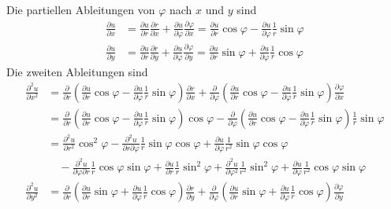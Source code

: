 Die partiellen Ableitungen von $\varphi$ nach $x$ und $y$ sind
\begin{align*}
\frac{\partial u}{\partial x}
&=
\frac{\partial u}{\partial r}
\frac{\partial r}{\partial x}
+
\frac{\partial u}{\partial\varphi}
\frac{\partial \varphi}{\partial x}
=
\frac{\partial u}{\partial r}
\cos\varphi
-
\frac{\partial u}{\partial\varphi}
\frac1r\sin\varphi
\\
\frac{\partial u}{\partial y}
&=
\frac{\partial u}{\partial r}
\frac{\partial r}{\partial y}
+
\frac{\partial u}{\partial\varphi}
\frac{\partial \varphi}{\partial y}
=
\frac{\partial u}{\partial r}
\sin\varphi
+
\frac{\partial u}{\partial\varphi}
\frac1r\cos\varphi
\end{align*}
Die zweiten Ableitungen sind
\begin{align*}
\frac{\partial^2u}{\partial x^2}
&=
\frac{\partial}{\partial r}
\left(
\frac{\partial u}{\partial r}
\cos\varphi
-
\frac{\partial u}{\partial\varphi}
\frac1r\sin\varphi
\right)
\frac{\partial r}{\partial x}
+
\frac{\partial }{\partial \varphi}
\left(
\frac{\partial u}{\partial r}
\cos\varphi
-
\frac{\partial u}{\partial\varphi}
\frac1r\sin\varphi
\right)
\frac{\partial\varphi}{\partial x}
\\
&=
\frac{\partial}{\partial r}
\left(
\frac{\partial u}{\partial r}
\cos\varphi
-
\frac{\partial u}{\partial\varphi}
\frac1r\sin\varphi
\right)
\cos\varphi
-
\frac{\partial }{\partial \varphi}
\left(
\frac{\partial u}{\partial r}
\cos\varphi
-
\frac{\partial u}{\partial\varphi}
\frac1r\sin\varphi
\right)
\frac1r\sin\varphi
\\
&=
\frac{\partial^2u}{\partial r^2} \cos^2\varphi
-
\frac{\partial^2u}{\partial r\partial\varphi} \frac1r\sin\varphi \cos\varphi
+
\frac{\partial u}{\partial\varphi} \frac1{r^2}\sin\varphi\cos\varphi
\\
&\quad
-
\frac{\partial^2u}{\partial\varphi\partial r}\frac1r \cos\varphi\sin\varphi
+\frac{\partial u}{\partial r}\frac1r\sin^2\varphi
+\frac{\partial^2u}{\partial\varphi^2}
\frac1{r^2}\sin^2\varphi
+\frac{\partial u}{\partial\varphi}\frac1{r^2}\cos\varphi\sin\varphi
\\
\frac{\partial^2u}{\partial y^2}
&=
\frac{\partial}{\partial r}
\left(
\frac{\partial u}{\partial r}
\sin\varphi
+
\frac{\partial u}{\partial\varphi}
\frac1r\cos\varphi
\right)
\frac{\partial r}{\partial y}
+
\frac{\partial}{\partial \varphi}
\left(
\frac{\partial u}{\partial r}
\sin\varphi
+
\frac{\partial u}{\partial\varphi}
\frac1r\cos\varphi
\right)
\frac{\partial \varphi}{\partial y}
\\

\end{align*}
